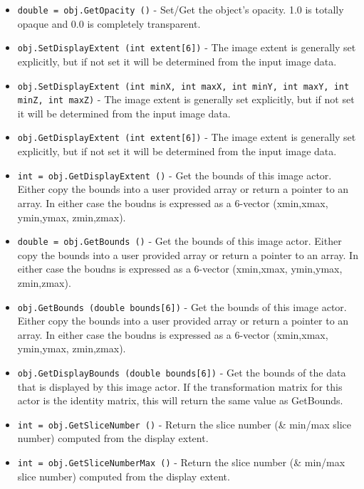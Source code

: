 \begin{itemize}
\item  \verb|double = obj.GetOpacity ()| -  Set/Get the object's opacity. 1.0 is totally opaque and 0.0 is completely
 transparent.

\item  \verb|obj.SetDisplayExtent (int extent[6])| -  The image extent is generally set explicitly, but if not set
 it will be determined from the input image data.

\item  \verb|obj.SetDisplayExtent (int minX, int maxX, int minY, int maxY, int minZ, int maxZ)| -  The image extent is generally set explicitly, but if not set
 it will be determined from the input image data.

\item  \verb|obj.GetDisplayExtent (int extent[6])| -  The image extent is generally set explicitly, but if not set
 it will be determined from the input image data.

\item  \verb|int = obj.GetDisplayExtent ()| -  Get the bounds of this image actor. Either copy the bounds
 into a user provided array or return a pointer to an array.
 In either case the boudns is expressed as a 6-vector 
 (xmin,xmax, ymin,ymax, zmin,zmax).

\item  \verb|double = obj.GetBounds ()| -  Get the bounds of this image actor. Either copy the bounds
 into a user provided array or return a pointer to an array.
 In either case the boudns is expressed as a 6-vector 
 (xmin,xmax, ymin,ymax, zmin,zmax).

\item  \verb|obj.GetBounds (double bounds[6])| -  Get the bounds of this image actor. Either copy the bounds
 into a user provided array or return a pointer to an array.
 In either case the boudns is expressed as a 6-vector 
 (xmin,xmax, ymin,ymax, zmin,zmax).

\item  \verb|obj.GetDisplayBounds (double bounds[6])| -  Get the bounds of the data that is displayed by this image
 actor.  If the transformation matrix for this actor is the
 identity matrix, this will return the same value as
 GetBounds.

\item  \verb|int = obj.GetSliceNumber ()| -  Return the slice number (\& min/max slice number) computed from the display
 extent.

\item  \verb|int = obj.GetSliceNumberMax ()| -  Return the slice number (\& min/max slice number) computed from the display
 extent.


\end{itemize}
